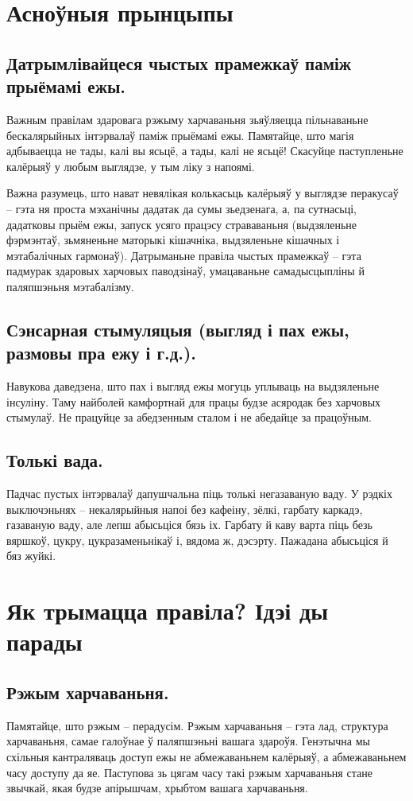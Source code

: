 \section{Асноўныя прынцыпы}

\subsection{Датрымлівайцеся чыстых прамежкаў паміж прыёмамі ежы.}
Важным правілам здаровага рэжыму харчаваньня зьяўляецца пільнаваньне бескалярыйных інтэрвалаў паміж прыёмамі ежы. Памятайце, што магія адбываецца не тады, калі вы ясьцё, а тады, калі не ясьцё! Скасуйце паступленьне калёрыяў у любым выглядзе, у тым ліку з напоямі.

Важна разумець, што нават невялікая колькасьць калёрыяў у выглядзе перакусаў – гэта ня проста мэханічны дадатак да сумы зьедзенага, а, па сутнасьці, дадатковы прыём ежы, запуск усяго працэсу страваваньня (выдзяленьне фэрмэнтаў, зьмяненьне маторыкі кішачніка, выдзяленьне кішачных і мэтабалічных гармонаў). Датрыманьне правіла чыстых прамежкаў – гэта падмурак здаровых харчовых паводзінаў, умацаваньне самадысцыпліны й паляпшэньня мэтабалізму.

\subsection{Сэнсарная стымуляцыя (выгляд і пах ежы, размовы пра ежу і г.д.).}
Навукова даведзена, што пах і выгляд ежы могуць уплываць на выдзяленьне інсуліну. Таму найболей камфортнай для працы будзе асяродак без харчовых стымулаў. Не працуйце за абедзенным сталом і не абедайце за працоўным.

\subsection{Толькі вада.}
Падчас пустых інтэрвалаў дапушчальна піць толькі негазаваную ваду. У рэдкіх выключэньнях – некалярыйныя напоі без кафеіну, зёлкі, гарбату каркадэ, газаваную ваду, але лепш абысьціся бязь іх. Гарбату й каву варта піць безь вяршкоў, цукру, цукразаменьнікаў і, вядома ж, дэсэрту. Пажадана абысьціся й бяз жуйкі.

\section{Як трымацца правіла? Ідэі ды парады}

\subsection{Рэжым харчаваньня.}
Памятайце, што рэжым – перадусім. Рэжым харчаваньня – гэта лад, структура харчаваньня, самае галоўнае ў паляпшэньні вашага здароўя. Генэтычна мы схільныя кантраляваць доступ ежы не абмежаваньнем калёрыяў, а абмежаваньнем часу доступу да яе. Паступова зь цягам часу такі рэжым харчаваньня стане звычкай, якая будзе апірышчам, хрыбтом вашага харчаваньня.


